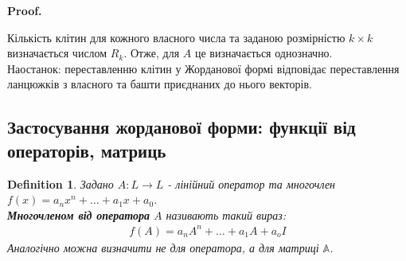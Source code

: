 \documentclass[a4paper, 10pt]{article}
\makeatletter
\theoremstyle{theoremdd}
\newtheorem{definition}[theorem]{Definition}
\renewenvironment{proof}[1][Proof.\\]{\par
\pushQED{\hfill \qed}%
\normalfont \topsep6\p@\@plus6\p@\relax
\trivlist
\item\relax
{\bfseries
#1\@addpunct{.}}\hspace\labelsep\ignorespaces
}{%
\popQED\endtrivlist\@endpefalse
}
\makeatother
\begin{document}
\begin{proof}
Кількість клітин для кожного власного числа та заданою розмірністю $k \times k$ визначається числом $R_k$. Отже, для $A$ це визначається однозначно.\\
Наостанок: переставленню клітин у Жорданової формі відповідає переставлення ланцюжків з власного та башти приєднаних до нього векторів.
\end{proof}

\subsection{Застосування жорданової форми: функції від операторів, матриць}
\begin{definition}
Задано $A: L \to L$ - лінійний оператор та многочлен $f(x) = a_n x^n + \dots + a_1 x + a_0$.\\
\textbf{Многочленом від оператора} $A$ називають такий вираз:
\begin{align*}
f(A) = a_n A^n + \dots + a_1 A + a_o I
\end{align*}
Аналогічно можна визначити не для оператора, а для матриці $\mathbb{A}$.
\end{definition}
\end{document}

